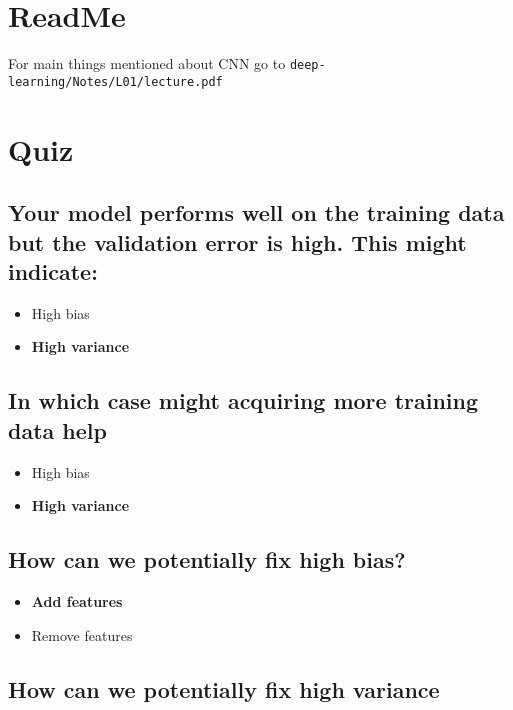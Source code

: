 \documentclass[11pt]{article}
\begin{document}


\tableofcontents

\clearpage

\section{ReadMe}

For main things mentioned about CNN go to \texttt{deep-learning/Notes/L01/lecture.pdf}

\section{Quiz}

\subsection{Your model performs well on the training data but the validation error is high. This might indicate:}

\begin{itemize}
    \item High bias
    \item \textbf{High variance}
\end{itemize}

\subsection{In which case might acquiring more training data help}

\begin{itemize}
    \item High bias
    \item \textbf{High variance}
\end{itemize}

\subsection{How can we potentially fix high bias?}

\begin{itemize}
    \item \textbf{Add features}
    \item Remove features
\end{itemize}

\subsection{How can we potentially fix high variance}
\end{document}
